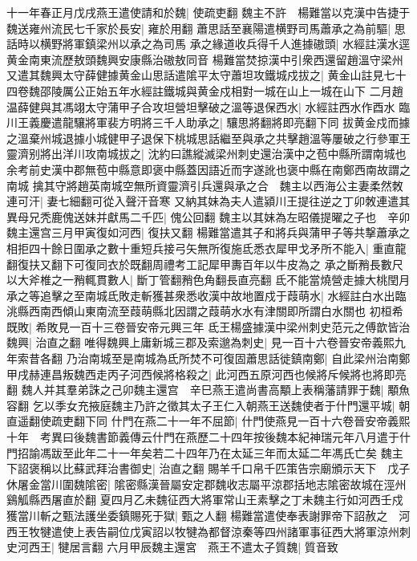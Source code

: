 十一年春正月戊戌燕王遣使請和於魏|{
	使疏吏翻}
魏主不許　楊難當以克漢中告捷于魏送雍州流民七千家於長安|{
	雍於用翻}
蕭思話至襄陽遣横野司馬蕭承之為前驅|{
	思話時以横野將軍鎮梁州以承之為司馬}
承之緣道收兵得千人進據磝頭|{
	水經註漢水逕黄金南東流歷敖頭魏興安康縣治磝敖同音}
楊難當焚掠漢中引衆西還留趙溫守梁州又遣其魏興太守薛健據黄金山思話遣隂平太守蕭坦攻鐵城戍拔之|{
	黄金山註見七十四卷魏邵陵厲公正始五年水經註鐵城與黄金戍相對一城在山上一城在山下}
二月趙温薛健與其馮翊太守蒲甲子合攻坦營坦擊破之溫等退保西水|{
	水經註西水作酉水}
臨川王義慶遣龍驤將軍裴方明將三千人助承之|{
	驤思將翻將即亮翻下同}
拔黄金戍而據之溫棄州城退據小城健甲子退保下桃城思話繼至與承之共擊趙溫等屢破之行參軍王靈濟别將出洋川攻南城拔之|{
	沈約曰譙縱滅梁州刺史還治漢中之苞中縣所謂南城也余考前史漢中郡無苞中縣意即褒中縣蓋因語近而字遂訛也褒中縣在南鄭西南故謂之南城}
擒其守將趙英南城空無所資靈濟引兵還與承之合　魏主以西海公主妻柔然敇連可汗|{
	妻七細翻可從入聲汗音寒}
又納其妹為夫人遣潁川王提往逆之丁卯敇連遣其異母兄秃鹿傀送妹并獻馬二千匹|{
	傀公回翻}
魏主以其妹為左昭儀提曜之子也　辛卯魏主還宫三月甲寅復如河西|{
	復扶又翻}
楊難當遣其子和將兵與蒲甲子等共撃蕭承之相拒四十餘日圍承之數十重短兵接弓矢無所復施氐悉衣犀甲戈矛所不能入|{
	重直龍翻復扶又翻下可復同衣於既翻周禮考工記犀甲夀百年以牛皮為之}
承之斷矟長數尺以大斧椎之一矟輒貫數人|{
	斷丁管翻矟色角翻長直亮翻}
氐不能當燒營走據大桃閏月承之等追擊之至南城氐敗走斬獲甚衆悉收漢中故地置戍于葭萌水|{
	水經註白水出臨洮縣西南西傾山東南流至葭萌縣北因謂之葭萌水水有津關即所謂白水關也}
初桓希既敗|{
	希敗見一百十三卷晉安帝元興三年}
氐王楊盛據漢中梁州刺史范元之傅歆皆治魏興|{
	治直之翻}
唯得魏興上庸新城三郡及索邈為刺史|{
	見一百十六卷晉安帝義熙九年索昔各翻}
乃治南城至是南城為氐所焚不可復固蕭思話徙鎮南鄭|{
	自此梁州治南鄭}
甲戌赫連昌叛魏西走丙子河西候將格殺之|{
	此河西五原河西也候將斥候將也將即亮翻}
魏人并其羣弟誅之己卯魏主還宫　辛巳燕王遣尚書高顒上表稱藩請罪于魏|{
	顒魚容翻}
乞以季女充掖庭魏主乃許之徵其太子王仁入朝燕王送魏使者于什門還平城|{
	朝直遥翻使疏吏翻下同}
什門在燕二十一年不屈節|{
	什門使燕見一百十六卷晉安帝義熙十年　考異曰後魏書節義傳云什門在燕歷二十四年按後魏本紀神瑞元年八月遣于什門招諭馮跋至此年二十一年矣若二十四年乃在太延三年而太延二年馮氏亡矣}
魏主下詔褒稱以比蘇武拜治書御史|{
	治直之翻}
賜羊千口帛千匹策告宗廟頒示天下　戊子休屠金當川圍魏隂密|{
	隂密縣漢晉屬安定郡魏收志屬平涼郡括地志隂密故城在涇州鷄觚縣西屠直於翻}
夏四月乙未魏征西大將軍常山王素擊之丁未魏主行如河西壬戍獲當川斬之甄法護坐委鎮賜死于獄|{
	甄之人翻}
楊難當遣使奉表謝罪帝下詔赦之　河西王牧犍遣使上表告嗣位戊寅詔以牧犍為都督涼秦等四州諸軍事征西大將軍涼州刺史河西王|{
	犍居言翻}
六月甲辰魏主還宮　燕王不遣太子質魏|{
	質音致}
